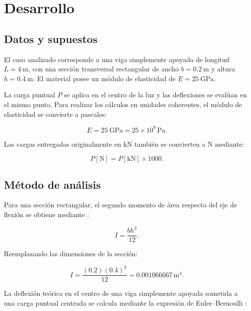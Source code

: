 \section{Desarrollo}

\subsection{Datos y supuestos}

El caso analizado corresponde a una viga simplemente apoyada de longitud
$L=\SI{4}{\metre}$, con una sección transversal rectangular de ancho
$b=\SI{0.2}{\metre}$ y altura $h=\SI{0.4}{\metre}$. El material posee un módulo
de elasticidad de $E=\SI{25}{\giga\pascal}$.

La carga puntual $P$ se aplica en el centro de la luz y las deflexiones se
evalúan en el mismo punto. Para realizar los cálculos en unidades coherentes,
el módulo de elasticidad se convierte a pascales:

\begin{equation}
E=\SI{25}{\giga\pascal}
 = 25\times10^{9}\,\si{\pascal}.
\end{equation}

Las cargas entregadas originalmente en kN también se convierten a N mediante:

\begin{equation}
P[\si{\newton}] = P[\si{\kilo\newton}] \times 1000.
\end{equation}

\subsection{Método de análisis}

Para una sección rectangular, el segundo momento de área respecto del eje de
flexión se obtiene mediante \citep{GereGoodno2013}:

\begin{equation}
I=\frac{b h^{3}}{12}.
\label{eq:inercia}
\end{equation}

Reemplazando las dimensiones de la sección:

\begin{equation}
I=\frac{(0.2)(0.4)^3}{12}
 = 0.001066667\,\si{\metre\tothe{4}}.
\end{equation}

La deflexión teórica en el centro de una viga simplemente apoyada sometida a
una carga puntual centrada se calcula mediante la expresión de Euler--Bernoulli
\citep{Hibbeler2018}:

